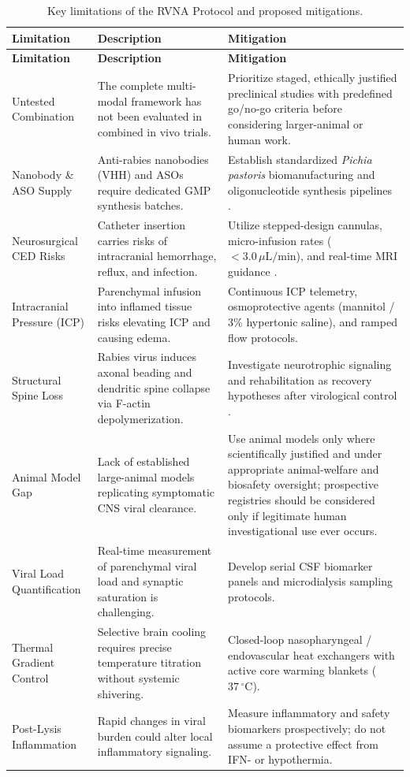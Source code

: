 \documentclass[12pt,a4paper]{article}
\begin{document}
\begin{longtable}{@{}p{3.8cm}p{5.8cm}p{5.4cm}@{}}
\caption{Key limitations of the RVNA Protocol and proposed mitigations.}\label{tab:limitations}\\
\toprule
\textbf{Limitation} & \textbf{Description} & \textbf{Mitigation} \\
\midrule
\endfirsthead
\toprule
\textbf{Limitation} & \textbf{Description} & \textbf{Mitigation} \\
\midrule
\endhead
Untested Combination & The complete multi-modal framework has not been evaluated in combined in vivo trials. & Prioritize staged, ethically justified preclinical studies with predefined go/no-go criteria before considering larger-animal or human work. \\
\addlinespace
Nanobody \& ASO Supply & Anti-rabies nanobodies (VHH) and ASOs require dedicated GMP synthesis batches. & Establish standardized \textit{Pichia pastoris} biomanufacturing and oligonucleotide synthesis pipelines \citep{terryn2016vhh}. \\
\addlinespace
Neurosurgical CED Risks & Catheter insertion carries risks of intracranial hemorrhage, reflux, and infection. & Utilize stepped-design cannulas, micro-infusion rates ($<3.0\,\mu\mathrm{L/min}$), and real-time MRI guidance \citep{parvar2025ced, narsinh2025ced}. \\
\addlinespace
Intracranial Pressure (ICP) & Parenchymal infusion into inflamed tissue risks elevating ICP and causing edema. & Continuous ICP telemetry, osmoprotective agents (mannitol / 3\% hypertonic saline), and ramped flow protocols. \\
\addlinespace
Structural Spine Loss & Rabies virus induces axonal beading and dendritic spine collapse via F-actin depolymerization. & Investigate neurotrophic signaling and rehabilitation as recovery hypotheses after virological control \citep{scott2008rabies, xu2023nt3, gluska2014p75}. \\
\addlinespace
Animal Model Gap & Lack of established large-animal models replicating symptomatic CNS viral clearance. & Use animal models only where scientifically justified and under appropriate animal-welfare and biosafety oversight; prospective registries should be considered only if legitimate human investigational use ever occurs. \\
\addlinespace
Viral Load Quantification & Real-time measurement of parenchymal viral load and synaptic saturation is challenging. & Develop serial CSF biomarker panels and microdialysis sampling protocols. \\
\addlinespace
Thermal Gradient Control & Selective brain cooling requires precise temperature titration without systemic shivering. & Closed-loop nasopharyngeal / endovascular heat exchangers with active core warming blankets ($37\,^{\circ}\mathrm{C}$). \\
\addlinespace
Post-Lysis Inflammation & Rapid changes in viral burden could alter local inflammatory signaling. & Measure inflammatory and safety biomarkers prospectively; do not assume a protective effect from IFN-\textbeta{} or hypothermia. \\
\bottomrule
\end{longtable}
\end{document}
